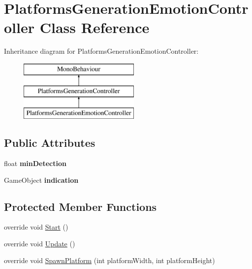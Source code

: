 \hypertarget{class_platforms_generation_emotion_controller}{}\section{Platforms\+Generation\+Emotion\+Controller Class Reference}
\label{class_platforms_generation_emotion_controller}
Inheritance diagram for Platforms\+Generation\+Emotion\+Controller\+:\begin{figure}[H]
\begin{center}
\leavevmode
\includegraphics[height=3.000000cm]{class_platforms_generation_emotion_controller}
\end{center}
\end{figure}
\subsection*{Public Attributes}
\begin{DoxyCompactItemize}
\item 
\mbox{\label{class_platforms_generation_emotion_controller_a261956e1bb4230393182f90727dc41d7}} 
float {\bfseries min\+Detection}
\item 
\mbox{\label{class_platforms_generation_emotion_controller_a3d9fa079a589b2ee2e26e44fca997556}} 
Game\+Object {\bfseries indication}
\end{DoxyCompactItemize}
\subsection*{Protected Member Functions}
\begin{DoxyCompactItemize}
\item 
override void \mbox{\hyperlink{class_platforms_generation_emotion_controller_a6014a59da6d2d4d789527778f78db7fe}{Start}} ()
\item 
override void \mbox{\hyperlink{class_platforms_generation_emotion_controller_a9df024fe907661ae1f126782f84a76fd}{Update}} ()
\item 
override void \mbox{\hyperlink{class_platforms_generation_emotion_controller_a6cc960afa43cdfc9c688b155fd262703}{Spawn\+Platform}} (int platform\+Width, int platform\+Height)
\end{DoxyCompactItemize}

